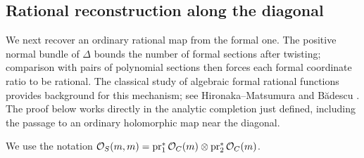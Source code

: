 \subsection{Rational reconstruction along the diagonal}

We next recover an ordinary rational map from the formal one. The
positive normal bundle of \(\Delta\) bounds the number of formal
sections after twisting; comparison with pairs of polynomial sections
then forces each formal coordinate ratio to be rational. The
classical study of algebraic formal rational functions provides
background for this mechanism; see Hironaka--Matsumura \cite{HM68}
and B\u{a}descu \cite{Bad96}. The proof below works
directly in the analytic completion just defined, including the
passage to an ordinary holomorphic map near the diagonal.

We use the notation
\(\mathcal O_S(m,m)=\operatorname{pr}_1^*\mathcal O_C(m)\otimes\operatorname{pr}_2^*\mathcal O_C(m)\).


